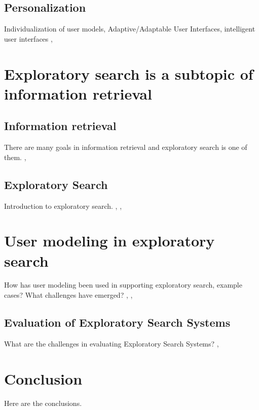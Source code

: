 \documentclass{sigchi}
\begin{document}
\subsection{Personalization}
Individualization of user models, Adaptive/Adaptable User Interfaces, intelligent user interfaces
\cite{bunt04}, \cite{findlater04}

\section {Exploratory search is a subtopic of information retrieval}

\subsection{Information retrieval}
There are many goals in information retrieval and exploratory search is one of them.
\cite{hearst02}, \cite{kuhlt91}

\subsection{Exploratory Search}
Introduction to exploratory search.
\cite{march06}, \cite{white09}, \cite{tvaro11}

\section{User modeling in exploratory search}
How has user modeling been used in supporting exploratory search, example cases? What challenges have emerged? 
\cite{oconnor10}, \cite{sugi04}, \cite{white07}

\subsection{Evaluation of Exploratory Search Systems}
What are the challenges in evaluating Exploratory Search Systems?
\cite{whitemm08}, \cite{kules08}

\section{Conclusion}
Here are the conclusions.
\end{document}
